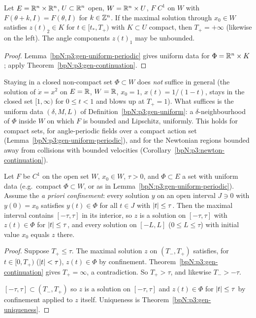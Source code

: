 \begin{corollary}\label{bpN:p3:gen-continuation-periodic}
Let $E=\mathbb{R}^n\times\mathbb{R}^n$, $U\subset\mathbb{R}^n$ open, $W=\mathbb{R}^n\times U$, $F$ $C^1$ on $W$ with $F(\theta+k,I)=F(\theta,I)$ for $k\in\mathbb{Z}^n$. If the maximal solution through $x_0\in W$ satisfies $z(t)_2\in K$ for $t\in[t_*,T_+)$ with $K\subset U$ compact, then $T_+=+\infty$ (likewise on the left). The angle components $z(t)_1$ may be unbounded.
\end{corollary}
\begin{proof}
Lemma~\ref{bpN:p3:gen-uniform-periodic} gives uniform data for $\Phi=\mathbb{R}^n\times K$; apply Theorem~\ref{bpN:p3:gen-continuation}.
\end{proof}

\begin{remark}\label{bpN:p3:gen-uniform-remark}
Staying in a closed non-compact set $\Phi\subset W$ does \emph{not} suffice in general (the solution of $\dot x=x^2$
on $E=\mathbb{R}$, $W=\mathbb{R}$, $x_0=1$, $x(t)=1/(1-t)$, stays in the closed set $[1,\infty)$ for $0\le t<1$ and blows up at $T_+=1$). What suffices is the
uniform data $(\delta,M,L)$ of Definition~\ref{bpN:p3:gen-uniform}: a $\delta$-neighbourhood of $\Phi$ inside $W$ on which $F$ is bounded and Lipschitz, uniformly. This holds for compact sets, for angle-periodic fields over a compact action set (Lemma~\ref{bpN:p3:gen-uniform-periodic}), and for the Newtonian regions bounded away from collisions with bounded velocities (Corollary~\ref{bpN:p3:newton-continuation}).
\end{remark}

\begin{theorem}\label{bpN:p3:gen-confinement}
Let $F$ be $C^1$ on the open set $W$, $x_0\in W$, $\tau>0$, and $\Phi\subset E$ a set with uniform data (e.g.\ compact
$\Phi\subset W$, or as in Lemma~\ref{bpN:p3:gen-uniform-periodic}). Assume the \emph{a priori confinement}: every
solution $y$ on an open interval $J\ni0$ with $y(0)=x_0$ satisfies $y(t)\in\Phi$ for all $t\in J$ with $\lvert t\rvert\le\tau$.
Then the maximal interval contains $[-\tau,\tau]$ in its interior, so $z$ is a solution on $[-\tau,\tau]$ with
$z(t)\in\Phi$ for $\lvert t\rvert\le\tau$, and every solution on $[-L,L]$ ($0\le L\le\tau$) with initial value $x_0$ equals $z$
there.
\end{theorem}
\begin{proof}
\label{stepN:p3:conf-noexit} Suppose $T_+\le\tau$. The maximal solution $z$ on $(T_-,T_+)$ satisfies, for $t\in[0,T_+)$ ($\lvert t\rvert<\tau$), $z(t)\in\Phi$ by confinement.
Theorem~\ref{bpN:p3:gen-continuation} gives $T_+=\infty$, a contradiction. So $T_+>\tau$, and likewise $T_->-\tau$.

\label{stepN:p3:conf-concl} $[-\tau,\tau]\subset(T_-,T_+)$ so $z$ is a solution on $[-\tau,\tau]$ and $z(t)\in\Phi$ for $\lvert t\rvert\le\tau$ by confinement applied to $z$ itself. Uniqueness is Theorem~\ref{bpN:p3:gen-uniqueness}.
\end{proof}


